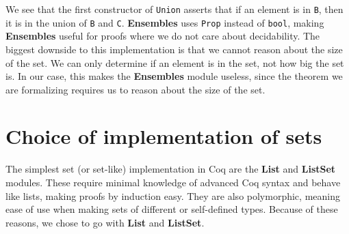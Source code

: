 We see that the first constructor of \lstinline{Union} asserts that if an element is in \lstinline{B},
then it is in the union of \lstinline{B} and \lstinline{C}.
\textbf{Ensembles} uses \lstinline{Prop} instead of \lstinline{bool},
making \textbf{Ensembles} useful for proofs where we do not care about decidability.
The biggest downside to this implementation is that we cannot reason about the size of the set.
We can only determine if an element is in the set, not how big the set is.
In our case, this makes the \textbf{Ensembles} module useless, since the theorem we are formalizing requires us to reason about the
size of the set.

\section{Choice of implementation of sets}
\label{sec:choice_of_implementation_of_sets}

The simplest set (or set-like) implementation in Coq are the \textbf{List} and \textbf{ListSet} modules.
These require minimal knowledge of advanced Coq syntax and behave like lists, making proofs by induction easy.
They are also polymorphic, meaning ease of use when making sets of different or self-defined types.
Because of these reasons, we chose to go with \textbf{List} and \textbf{ListSet}.
